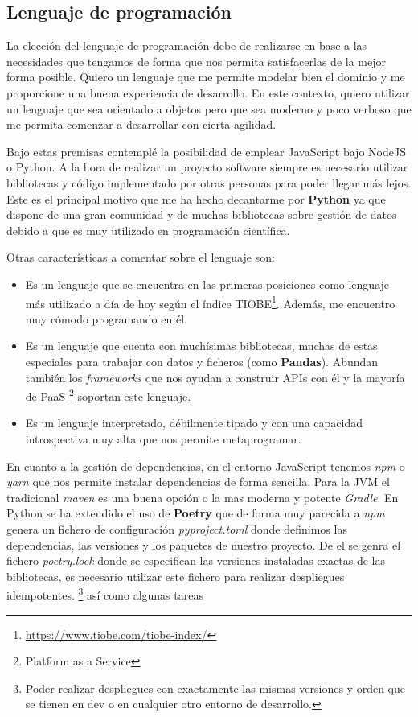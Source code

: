 \subsection{Lenguaje de programación}
La elección del lenguaje de programación debe de realizarse en base a las necesidades que
tengamos de forma que nos permita satisfacerlas de la mejor forma posible. Quiero un
lenguaje que me permite modelar bien el dominio y me proporcione una buena experiencia de
desarrollo. En este contexto, quiero utilizar un lenguaje que sea orientado a objetos pero
que sea moderno y poco verboso que me permita comenzar a desarrollar con cierta agilidad.

Bajo estas premisas contemplé la posibilidad de emplear JavaScript bajo NodeJS o Python. A
la hora de realizar un proyecto software siempre es necesario utilizar bibliotecas y
código implementado por otras personas para poder llegar más lejos. Este es el principal
motivo que me ha hecho decantarme por \textbf{Python} ya que dispone de una gran comunidad
y de muchas bibliotecas sobre gestión de datos debido a que es muy utilizado en
programación científica.

Otras características a comentar sobre el lenguaje son:
\begin{itemize}
    \item Es un lenguaje que se encuentra en las primeras posiciones como lenguaje más
    utilizado a día de hoy según el índice
    TIOBE\footnote{\href{Enlace al índice TIOBE.}{https://www.tiobe.com/tiobe-index/}}. Además, me encuentro muy cómodo
    programando en él.
    \item Es un lenguaje que cuenta con muchísimas bibliotecas, muchas de estas especiales
    para trabajar con datos y ficheros (como \textbf{Pandas}). Abundan también los
    \textit{frameworks} que nos ayudan a construir APIs con él y la mayoría de PaaS
    \footnote{Platform as a Service} soportan este lenguaje.
    \item Es un lenguaje interpretado, débilmente tipado y con una capacidad introspectiva
    muy alta que nos permite metaprogramar.
\end{itemize}

En cuanto a la gestión de dependencias, en el entorno JavaScript tenemos \textit{npm} o
\textit{yarn} que nos permite instalar dependencias de forma sencilla. Para la JVM el
tradicional \textit{maven} es una buena opción o la mas moderna y potente \textit{Gradle}.
En Python se ha extendido el uso de \textbf{Poetry} que de forma muy parecida a
\textit{npm} genera un fichero de configuración \textit{pyproject.toml} donde definimos
las dependencias, las versiones y los paquetes de nuestro proyecto. De el se genra el
fichero \textit{poetry.lock} donde se especifican las versiones instaladas exactas de las
bibliotecas, es necesario utilizar este fichero para realizar despliegues idempotentes.
\footnote{Poder realizar despliegues con exactamente las mismas versiones y orden que se
tienen en dev o en cualquier otro entorno de desarrollo.} así como algunas tareas

